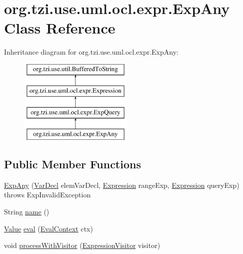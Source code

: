 \hypertarget{classorg_1_1tzi_1_1use_1_1uml_1_1ocl_1_1expr_1_1_exp_any}{\section{org.\-tzi.\-use.\-uml.\-ocl.\-expr.\-Exp\-Any Class Reference}
\label{classorg_1_1tzi_1_1use_1_1uml_1_1ocl_1_1expr_1_1_exp_any}
}
Inheritance diagram for org.\-tzi.\-use.\-uml.\-ocl.\-expr.\-Exp\-Any\-:\begin{figure}[H]
\begin{center}
\leavevmode
\includegraphics[height=4.000000cm]{classorg_1_1tzi_1_1use_1_1uml_1_1ocl_1_1expr_1_1_exp_any}
\end{center}
\end{figure}
\subsection*{Public Member Functions}
\begin{DoxyCompactItemize}
\item 
\hyperlink{classorg_1_1tzi_1_1use_1_1uml_1_1ocl_1_1expr_1_1_exp_any_a9fdd7031a6b4a157402ac761fabd5e8e}{Exp\-Any} (\hyperlink{classorg_1_1tzi_1_1use_1_1uml_1_1ocl_1_1expr_1_1_var_decl}{Var\-Decl} elem\-Var\-Decl, \hyperlink{classorg_1_1tzi_1_1use_1_1uml_1_1ocl_1_1expr_1_1_expression}{Expression} range\-Exp, \hyperlink{classorg_1_1tzi_1_1use_1_1uml_1_1ocl_1_1expr_1_1_expression}{Expression} query\-Exp)  throws Exp\-Invalid\-Exception     
\item 
String \hyperlink{classorg_1_1tzi_1_1use_1_1uml_1_1ocl_1_1expr_1_1_exp_any_ac67ed7311f17ec7e6c0faf6969ab4158}{name} ()
\item 
\hyperlink{classorg_1_1tzi_1_1use_1_1uml_1_1ocl_1_1value_1_1_value}{Value} \hyperlink{classorg_1_1tzi_1_1use_1_1uml_1_1ocl_1_1expr_1_1_exp_any_a53c2bddc27561e542e4e8c515efb511c}{eval} (\hyperlink{classorg_1_1tzi_1_1use_1_1uml_1_1ocl_1_1expr_1_1_eval_context}{Eval\-Context} ctx)
\item 
void \hyperlink{classorg_1_1tzi_1_1use_1_1uml_1_1ocl_1_1expr_1_1_exp_any_a96dfc0be5139ac964d33cd70fede38b0}{process\-With\-Visitor} (\hyperlink{interfaceorg_1_1tzi_1_1use_1_1uml_1_1ocl_1_1expr_1_1_expression_visitor}{Expression\-Visitor} visitor)
\end{DoxyCompactItemize}
